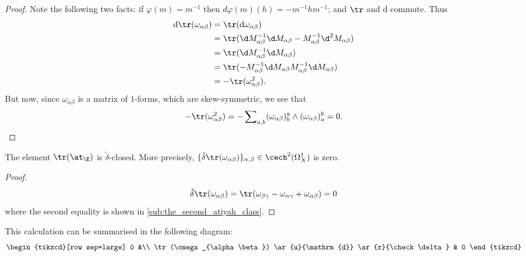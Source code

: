         \begin{proof}
            Note the following two facts: if $\varphi(m)=m^{-1}$ then $d\varphi(m)(h)=-m^{-1}hm^{-1}$; and $\tr$ and $\mathrm{d}$ commute.
            Thus
            \begin{align*}
                \mathrm{d}\tr(\omega_{\alpha\beta}) &= \tr(\mathrm{d}\omega_{\alpha\beta})\\
                &= \tr(\d M_{\alpha\beta}^{-1}\d M_{\alpha\beta} - M_{\alpha\beta}^{-1}\d^2M_{\alpha\beta})\\
                &= \tr(\d M_{\alpha\beta}^{-1}\d M_{\alpha\beta})\\
                &= \tr(-M_{\alpha\beta}^{-1}\d M_{\alpha\beta}M_{\alpha\beta}^{-1}\d M_{\alpha\beta})\\
                &= -\tr(\omega_{\alpha\beta}^2).
            \end{align*}
            But now, since $\omega_{\alpha\beta}$ is a matrix of $1$-forms, which are skew-symmetric, we see that
            \[
                -\tr(\omega_{\alpha\beta}^2) = -\sum\nolimits_{a,b}(\omega_{\alpha\beta})^a_b \wedge (\omega_{\alpha\beta})^b_a = 0.\qedhere
            \]
        \end{proof}

        \begin{lemma}
            The element $\tr(\at_\E)$ is $\check\delta$-closed.
            More precisely, $\{\check\delta\tr(\omega_{\alpha\beta})\}_{\alpha,\beta}\in\cech^2(\Omega^1_X)$ is zero.
        \end{lemma}

        \begin{proof}
            \[
                \check\delta\tr(\omega_{\alpha\beta}) = \tr(\omega_{\beta\gamma}-\omega_{\alpha\gamma}+\omega_{\alpha\beta})=0
            \]
            where the second equality is shown in \cref{sub:the_second_atiyah_class}.
        \end{proof}
        
        This calculation can be summarised in the following diagram:
        \begin{equation}
            \begin{tikzcd}[row sep=large]
                0
                &\\
                \tr(\omega_{\alpha\beta})
                    \ar{u}{\mathrm{d}}
                    \ar{r}{\check\delta}
                & 0
            \end{tikzcd}
        \end{equation}


